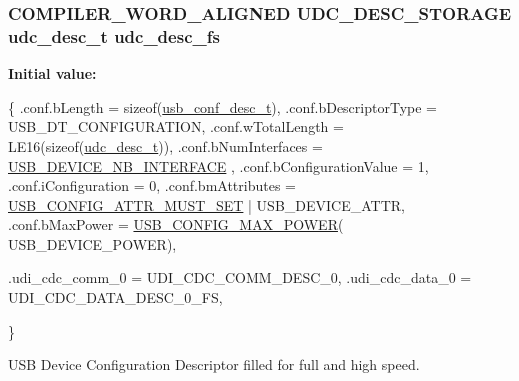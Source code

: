 \hypertarget{group__udi__cdc__group__single__desc_ga694cd2202d59a342c2ed2e50f427a932}{
\subsubsection[{udc\-\_\-desc\-\_\-fs}]{\setlength{\rightskip}{0pt plus 5cm}C\-O\-M\-P\-I\-L\-E\-R\-\_\-\-W\-O\-R\-D\-\_\-\-A\-L\-I\-G\-N\-E\-D {\bf U\-D\-C\-\_\-\-D\-E\-S\-C\-\_\-\-S\-T\-O\-R\-A\-G\-E} {\bf udc\-\_\-desc\-\_\-t} udc\-\_\-desc\-\_\-fs}}\label{group__udi__cdc__group__single__desc_ga694cd2202d59a342c2ed2e50f427a932}
{\bfseries Initial value\-:}
\begin{DoxyCode}
 \{
        .conf.bLength              = \textcolor{keyword}{sizeof}(\hyperlink{structusb__conf__desc__t}{usb\_conf\_desc\_t}),
        .conf.bDescriptorType      = USB\_DT\_CONFIGURATION,
        .conf.wTotalLength         = LE16(\textcolor{keyword}{sizeof}(\hyperlink{structudc__desc__t}{udc\_desc\_t})),
        .conf.bNumInterfaces       = \hyperlink{group__udi__cdc__group__single__desc_gad079423a5116ebac5e26628447e0d0c1}{USB\_DEVICE\_NB\_INTERFACE}
      ,
        .conf.bConfigurationValue  = 1,
        .conf.iConfiguration       = 0,
        .conf.bmAttributes         = \hyperlink{group__usb__protocol__group_gac7063e965def0eaeb4d45a6f9048dc53}{USB\_CONFIG\_ATTR\_MUST\_SET}
       | USB\_DEVICE\_ATTR,
        .conf.bMaxPower            = \hyperlink{group__usb__protocol__group_ga55d9db758a4f408eebf4b26c6001ac9b}{USB\_CONFIG\_MAX\_POWER}(
      USB\_DEVICE\_POWER),

        .udi\_cdc\_comm\_0            = UDI\_CDC\_COMM\_DESC\_0,
        .udi\_cdc\_data\_0            = UDI\_CDC\_DATA\_DESC\_0\_FS,








\}
\end{DoxyCode}


U\-S\-B Device Configuration Descriptor filled for full and high speed. 

